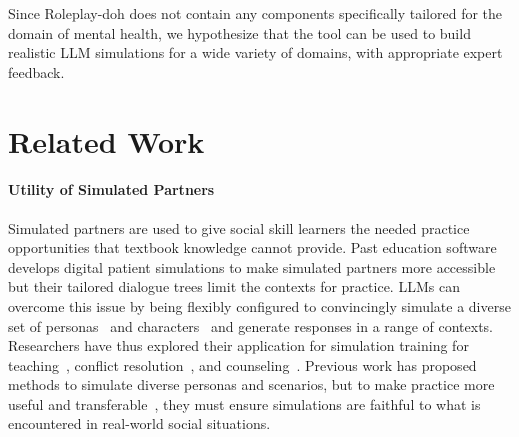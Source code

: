 \documentclass[11pt]{article}
\begin{document}
Since Roleplay-doh does not contain any components specifically tailored for the domain of mental health, we hypothesize that the tool can be used to build realistic LLM simulations for a wide variety of domains, with appropriate expert feedback.

 \vspace{-0.05in}
\section{Related Work}\vspace{-0.05in}
\paragraph{Utility of Simulated Partners}
Simulated partners are used to give social skill learners the needed practice opportunities that textbook knowledge cannot provide. %
Past education software develops digital patient simulations to make simulated partners more accessible~\cite{othlinghaus2020seriousroleplaying} but their tailored dialogue trees limit the contexts for practice. LLMs can overcome this issue by being flexibly configured to convincingly simulate a diverse set of personas~\cite{park2022social} and characters~\cite{park2023generative} and generate responses in a range of contexts. Researchers have thus explored their application for simulation training for teaching~\cite{markel_opferman_landay_piech_2023}, conflict resolution~\cite{rehearsal}, and counseling~\cite{demasi-etal-2020-multi,tanana2019development}. 
Previous work has proposed methods to simulate diverse personas and scenarios, but to make practice more useful and transferable~\cite{alinier2022simulation}, they must ensure simulations are faithful to what is encountered in real-world social situations.
\end{document}
